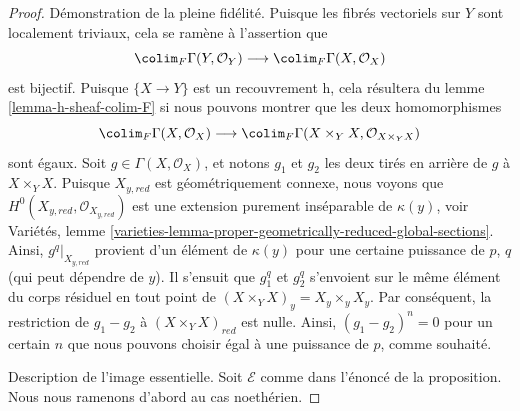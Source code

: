 \begin{proof}
Démonstration de la pleine fidélité. Puisque les fibrés vectoriels sur $Y$ sont localement
triviaux, cela se ramène à l'assertion que
$$
\colim_F \Gamma(Y, \mathcal{O}_Y)
\longrightarrow
\colim_F \Gamma(X, \mathcal{O}_X)
$$
est bijectif. Puisque $\{X \to Y\}$ est un recouvrement h, cela
résultera du lemme \ref{lemma-h-sheaf-colim-F} si nous pouvons montrer que les deux homomorphismes
$$
\colim_F \Gamma(X, \mathcal{O}_X)
\longrightarrow
\colim_F \Gamma(X \times_Y X, \mathcal{O}_{X \times_Y X})
$$
sont égaux. Soit $g \in \Gamma(X, \mathcal{O}_X)$,
et notons $g_1$ et $g_2$ les deux tirés en arrière de $g$ à $X \times_Y X$.
Puisque $X_{y, red}$ est géométriquement connexe, nous
voyons que\newline $H^0(X_{y, red}, \mathcal{O}_{X_{y, red}})$ est
une extension purement inséparable de $\kappa(y)$, voir
Variétés, lemme
\ref{varieties-lemma-proper-geometrically-reduced-global-sections}.
Ainsi, $g^q|_{X_{y, red}}$ provient d'un élément de
$\kappa(y)$ pour une certaine puissance de $p$, $q$ (qui peut dépendre de $y$).
Il s'ensuit que $g_1^q$ et $g_2^q$ s'envoient sur le même
élément du corps résiduel en tout point de
$(X \times_Y X)_y = X_y \times_y X_y$.
Par conséquent, la restriction de $g_1 - g_2$ à $(X \times_Y X)_{red}$ est nulle.
Ainsi, $(g_1 - g_2)^n = 0$ pour un certain $n$ que nous pouvons choisir
égal à une puissance de $p$, comme souhaité.

\medskip\noindent
Description de l'image essentielle. Soit $\mathcal{E}$ comme dans l'énoncé
de la proposition. Nous nous ramenons d'abord au cas noethérien.


\end{proof}
